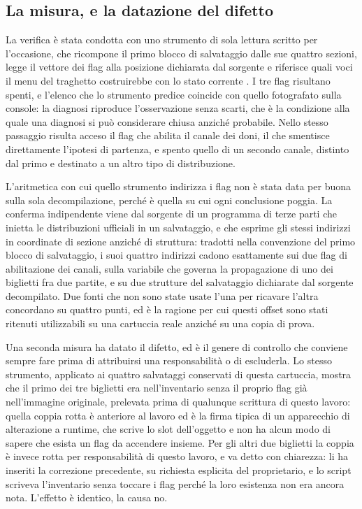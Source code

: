 \subsection{La misura, e la datazione del difetto}

La verifica è stata condotta con uno strumento di sola lettura scritto per l'occasione, che ricompone il primo blocco di salvataggio dalle sue quattro sezioni, legge il vettore dei flag alla posizione dichiarata dal sorgente e riferisce quali voci il menu del traghetto costruirebbe con lo stato corrente \cite{pokeemerald}. I tre flag risultano spenti, e l'elenco che lo strumento predice coincide con quello fotografato sulla console: la diagnosi riproduce l'osservazione senza scarti, che è la condizione alla quale una diagnosi si può considerare chiusa anziché probabile. Nello stesso passaggio risulta acceso il flag che abilita il canale dei doni, il che smentisce direttamente l'ipotesi di partenza, e spento quello di un secondo canale, distinto dal primo e destinato a un altro tipo di distribuzione.

L'aritmetica con cui quello strumento indirizza i flag non è stata data per buona sulla sola decompilazione, perché è quella su cui ogni conclusione poggia. La conferma indipendente viene dal sorgente di un programma di terze parti che inietta le distribuzioni ufficiali in un salvataggio, e che esprime gli stessi indirizzi in coordinate di sezione anziché di struttura: tradotti nella convenzione del primo blocco di salvataggio, i suoi quattro indirizzi cadono esattamente sui due flag di abilitazione dei canali, sulla variabile che governa la propagazione di uno dei biglietti fra due partite, e su due strutture del salvataggio dichiarate dal sorgente decompilato. Due fonti che non sono state usate l'una per ricavare l'altra concordano su quattro punti, ed è la ragione per cui questi offset sono stati ritenuti utilizzabili su una cartuccia reale anziché su una copia di prova.

Una seconda misura ha datato il difetto, ed è il genere di controllo che conviene sempre fare prima di attribuirsi una responsabilità o di escluderla. Lo stesso strumento, applicato ai quattro salvataggi conservati di questa cartuccia, mostra che il primo dei tre biglietti era nell'inventario senza il proprio flag già nell'immagine originale, prelevata prima di qualunque scrittura di questo lavoro: quella coppia rotta è anteriore al lavoro ed è la firma tipica di un apparecchio di alterazione a runtime, che scrive lo slot dell'oggetto e non ha alcun modo di sapere che esista un flag da accendere insieme. Per gli altri due biglietti la coppia è invece rotta per responsabilità di questo lavoro, e va detto con chiarezza: li ha inseriti la correzione precedente, su richiesta esplicita del proprietario, e lo script scriveva l'inventario senza toccare i flag perché la loro esistenza non era ancora nota. L'effetto è identico, la causa no.

